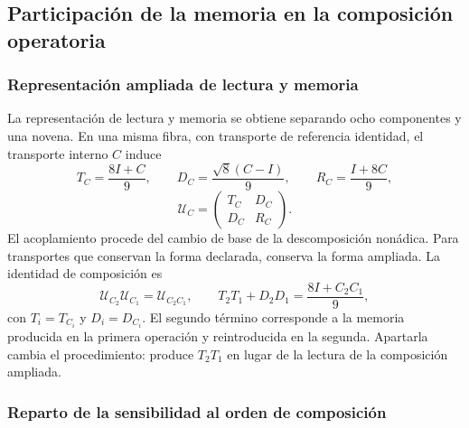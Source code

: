 \subsection{Participación de la memoria en la composición operatoria}
\label{md:restop:memoria}

\subsubsection{Representación ampliada de lectura y memoria}
\label{md:restop:estructura-partida}

La representación de lectura y memoria se obtiene separando ocho
componentes y una novena. En una misma fibra, con transporte de referencia
identidad, el transporte interno $C$ induce
\begin{equation}
 T_C=\frac{8I+C}{9},\qquad
 D_C=\frac{\sqrt8(C-I)}{9},\qquad
 R_C=\frac{I+8C}{9},
 \label{md:restop:bloques}
\end{equation}
\begin{equation}
 \mathcal U_C=
 \begin{pmatrix}
 T_C&D_C\\D_C&R_C
 \end{pmatrix}.
 \label{md:restop:transporte-ampliado}
\end{equation}
El acoplamiento procede del cambio de base de la descomposición nonádica.
Para transportes que conservan la forma declarada, conserva la forma
ampliada. La identidad de composición es
\begin{equation}
 \mathcal U_{C_2}\mathcal U_{C_1}
 =\mathcal U_{C_2C_1},\qquad
 T_2T_1+D_2D_1=\frac{8I+C_2C_1}{9},
 \label{md:restop:composicion-ampliada}
\end{equation}
con $T_i=T_{C_i}$ y $D_i=D_{C_i}$.
El segundo término corresponde a la memoria producida en la primera
operación y reintroducida en la segunda. Apartarla cambia el
procedimiento: produce $T_2T_1$ en lugar de la lectura de la composición
ampliada.

\subsubsection{Reparto de la sensibilidad al orden de composición}
\label{md:restop:conmutadores}

